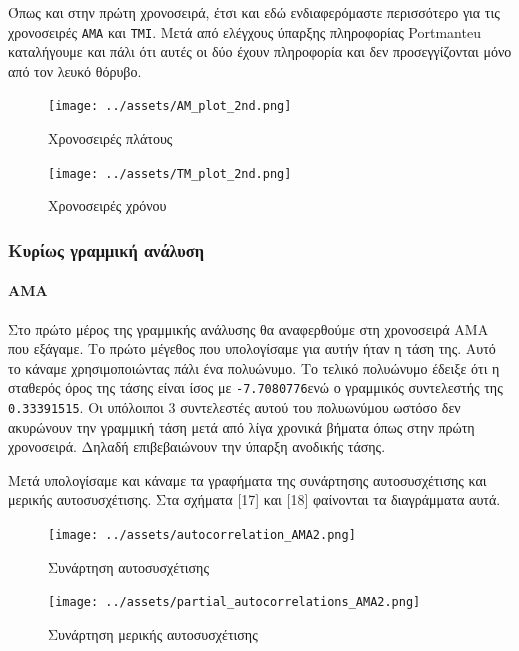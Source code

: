 \documentclass[11pt,]{article}
\let\oldparagraph\paragraph
\renewcommand{\paragraph}[1]{\oldparagraph{#1}\mbox{}}
\begin{document}
Όπως και στην πρώτη χρονοσειρά, έτσι και εδώ ενδιαφερόμαστε περισσότερο
για τις χρονοσειρές \texttt{AMA} και \texttt{TMI}. Μετά από ελέγχους
ύπαρξης πληροφορίας Portmanteu καταλήγουμε και πάλι ότι αυτές οι δύο
έχουν πληροφορία και δεν προσεγγίζονται μόνο από τον λευκό θόρυβο.

\begin{figure}
\centering
\texttt{[image: ../assets/AM\_plot\_2nd.png]}
\caption{Χρονοσειρές πλάτους}
\end{figure}

\begin{figure}
\centering
\texttt{[image: ../assets/TM\_plot\_2nd.png]}
\caption{Χρονοσειρές χρόνου}
\end{figure}

\hypertarget{ux3baux3c5ux3c1ux3afux3c9ux3c2-ux3b3ux3c1ux3b1ux3bcux3bcux3b9ux3baux3ae-ux3b1ux3bdux3acux3bbux3c5ux3c3ux3b7-1}{%
\subsubsection{Κυρίως γραμμική
ανάλυση}\label{ux3baux3c5ux3c1ux3afux3c9ux3c2-ux3b3ux3c1ux3b1ux3bcux3bcux3b9ux3baux3ae-ux3b1ux3bdux3acux3bbux3c5ux3c3ux3b7-1}}

\hypertarget{ama-1}{%
\paragraph{AMA}\label{ama-1}}

Στο πρώτο μέρος της γραμμικής ανάλυσης θα αναφερθούμε στη χρονοσειρά AMA
που εξάγαμε. Το πρώτο μέγεθος που υπολογίσαμε για αυτήν ήταν η τάση της.
Αυτό το κάναμε χρησιμοποιώντας πάλι ένα πολυώνυμο. Το τελικό πολυώνυμο
έδειξε ότι η σταθερός όρος της τάσης είναι ίσος με
\texttt{-7.7080776}ενώ ο γραμμικός συντελεστής της \texttt{0.33391515}.
Οι υπόλοιποι 3 συντελεστές αυτού του πολυωνύμου ωστόσο δεν ακυρώνουν την
γραμμική τάση μετά από λίγα χρονικά βήματα όπως στην πρώτη χρονοσειρά.
Δηλαδή επιβεβαιώνουν την ύπαρξη ανοδικής τάσης.

Μετά υπολογίσαμε και κάναμε τα γραφήματα της συνάρτησης αυτοσυσχέτισης
και μερικής αυτοσυσχέτισης. Στα σχήματα {[}17{]} και {[}18{]} φαίνονται
τα διαγράμματα αυτά.

\begin{figure}
\centering
\texttt{[image: ../assets/autocorrelation\_AMA2.png]}
\caption{Συνάρτηση αυτοσυσχέτισης}
\end{figure}

\begin{figure}
\centering
\texttt{[image: ../assets/partial\_autocorrelations\_AMA2.png]}
\caption{Συνάρτηση μερικής αυτοσυσχέτισης}
\end{figure}
\end{document}
